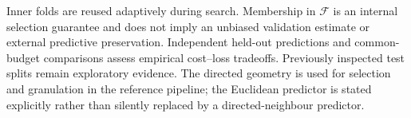 Inner folds are reused adaptively during search. Membership in $\mathcal F$ is an internal selection guarantee and does not imply an unbiased validation estimate or external predictive preservation. Independent held-out predictions and common-budget comparisons assess empirical cost--loss tradeoffs. Previously inspected test splits remain exploratory evidence. The directed geometry is used for selection and granulation in the reference pipeline; the Euclidean predictor is stated explicitly rather than silently replaced by a directed-neighbour predictor.
